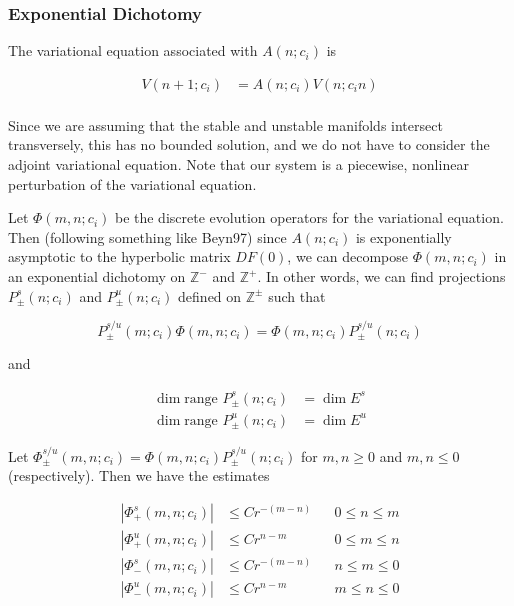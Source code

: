 \documentclass[12pt]{article}
\def\Z{{\mathbb Z}}
\begin{document}
\subsubsection{Exponential Dichotomy}

The variational equation associated with $A(n; c_i)$ is

\begin{align}
V(n+1; c_i) &= A(n; c_i) V(n; c_in) \label{vareq} \\
\end{align}

Since we are assuming that the stable and unstable manifolds intersect transversely, this has no bounded solution, and we do not have to consider the adjoint variational equation. Note that our system is a piecewise, nonlinear perturbation of the variational equation.

Let $\Phi(m, n; c_i)$ be the discrete evolution operators for the variational equation. Then (following something like Beyn97) since $A(n; c_i)$ is exponentially asymptotic to the hyperbolic matrix $DF(0)$, we can decompose $\Phi(m, n; c_i)$ in an exponential dichotomy on $\Z^-$ and $\Z^+$. In other words, we can find projections $P_\pm^s(n; c_i)$ and $P_\pm^u(n; c_i)$ defined on $\Z^\pm$ such that

\begin{equation}\label{projcommute}
P_\pm^{s/u}(m; c_i) \Phi(m, n; c_i) =  \Phi(m, n; c_i) P_\pm^{s/u}(n; c_i)
\end{equation}

and

\begin{align*}
\dim \text{range }P_\pm^s(n; c_i) &= \dim E^s \\
\dim \text{range }P_\pm^u(n; c_i) &= \dim E^u
\end{align*}

Let $\Phi_\pm^{s/u}(m, n; c_i) = \Phi(m, n; c_i) P_\pm^{s/u}(n; c_i)$ for $m, n \geq 0$ and $m, n \leq 0$ (respectively). Then we have the estimates

\begin{align*}
|\Phi_+^s(m, n; c_i)| &\leq C r^{-(m - n)} && 0 \leq n \leq m \\
|\Phi_+^u(m, n; c_i)| &\leq C r^{n-m} && 0 \leq m \leq n \\
|\Phi_-^s(m, n; c_i)| &\leq C r^{-(m - n)} && n \leq m \leq 0 \\
|\Phi_-^u(m, n; c_i)| &\leq C r^{n-m} && m \leq n \leq 0\\
\end{align*}
\end{document}
